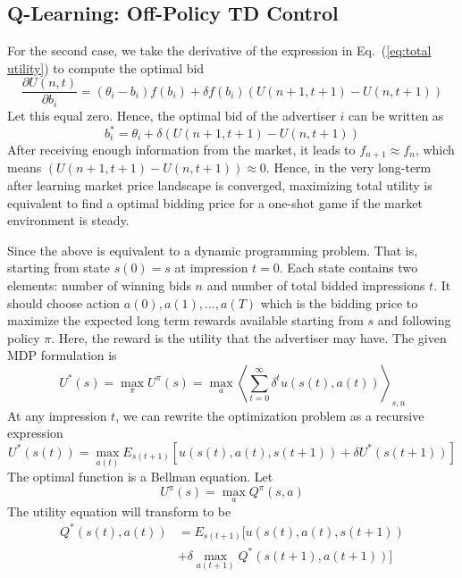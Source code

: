 \subsection{Q-Learning: Off-Policy TD Control}

For the second case, we take the derivative of the expression in Eq.~(\ref{eq:total utility}) to compute the optimal bid
\begin{equation}
\frac{{\partial U(n,t)}}{{\partial {b_i}}} = ({\theta _i} - {b_i})f({b_i}) + \delta f({b_i})(U(n + 1,t + 1) - U(n,t + 1))
\end{equation}
Let this equal zero. Hence, the optimal bid of the advertiser $i$ can be written as
\begin{equation}
{b_{i}^{*}} = \theta_i + \delta (U(n+1,t+1)-U(n,t+1))
\end{equation}
After receiving enough information from the market, it leads to $f_{n+1}\approx f_{n}$, which means $(U(n+1,t+1)-U(n,t+1))\approx 0$. Hence, in the very long-term after learning market price landscape is converged, maximizing total utility is equivalent to find a optimal bidding price for a one-shot game if the market environment is steady.

Since the above is equivalent to a dynamic programming problem. That is, starting from state $s(0)=s$ at impression $t=0$. Each state contains two elements: number of winning bids $n$ and number of total bidded impressions $t$. It should choose action $a(0),a(1),...,a(T)$ which is the bidding price to maximize the expected long term rewards available starting from $s$ and following policy $\pi$. Here, the reward is the utility that the advertiser may have. The given MDP formulation is
\begin{equation}
U^{*}(s)=\underset{\pi}\max U^{\pi}(s)=\underset{a} \max \left \langle \sum_{t=0}^{\infty }\delta^{t}u(s(t),a(t)) \right \rangle_{s,u}
\end{equation}
At any impression $t$, we can rewrite the optimization problem as a recursive expression
\begin{equation}
U^{*}(s(t))=\underset{a(t)} \max E_{s(t+1)}[u(s(t),a(t),s(t+1))+\delta U^{*}(s(t+1))]
\end{equation}
The optimal function is a Bellman equation.
Let
\begin{equation}
U^{\pi}(s)=\underset{a} \max Q^{\pi}(s,a)
\end{equation}
The utility equation will transform to be
\begin{equation}
\begin{split}
Q^{*}(s(t),a(t)) & =E_{s(t+1)}[u(s(t),a(t),s(t+1)) \\
& +\delta \underset{a(t+1)} \max Q^{*}(s(t+1),a(t+1))]
\end{split}
\end{equation}

